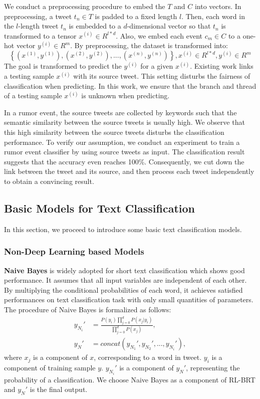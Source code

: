We conduct a preprocessing procedure to embed the $T$ and $C$ into vectors. In preprocessing, a tweet $t_n \in T $ is padded to a fixed length $l$. Then, each word in the $l$-length tweet $t_n$ is embedded to a $d$-dimensional vector so that $t_n$ is transformed to a tensor $x^{(i)} \in R^{l*d}$. Also, we embed each event $c_m \in C$ to a one-hot vector $y^{(i)} \in R^m$. By preprocessing, the dataset is transformed into: $$\left\{ (x^{(1)}, y^{(1)}), (x^{(2)}, y^{(2)}),..., (x^{(n)}, y^{(n)}) \right\}, x^{(i)} \in R^{l*d}, y^{(i)} \in R^m $$ The goal is transformed to predict the $y^{(i)}$ for a given $x^{(i)}$. Existing work \cite{DBLP:conf/www/ChengNB20} links a testing sample $x^{(i)}$ with its source tweet. This setting disturbs the fairness of classification when predicting. In this work, we ensure that the branch and thread of a testing sample $x^{(i)}$ is unknown when predicting.

In a rumor event, the source tweets are collected by keywords such that the semantic similarity between the source tweets is usually high. We observe that this high similarity between the source tweets disturbs the classification performance. To verify our assumption, we conduct an experiment to train a rumor event classifier by using source tweets as input. The classification result suggests that the accuracy even reaches 100\%. Consequently, we cut down the link between the tweet and its source, and then process each tweet independently to obtain a convincing result. 

\subsection{Basic Models for Text Classification}
\label{sec:deeplearning_model} 
In this section, we proceed to introduce some basic text classification models.

\subsubsection{Non-Deep Learning based Models}
\textbf{Naive Bayes} \cite{DBLP:journals/ml/DomingosP97} is widely adopted for short text classification which shows good performance. It assumes that all input variables are independent of each other. By multiplying the conditional probabilities of each word, it achieves satisfied performances on text classification task with only small quantities of parameters. The procedure of Naive Bayes is formalized as follows:
\begin{align}\label{eq:nb}
y_{N_{i}}' &= \frac{P(y_i)\prod_{j = 0}^d P(x_j|y_i)}{\prod_{j = 0}^d P(x_j)},\\
y_N' &= concat(y_{N_{1}}',y_{N_{2}}',..., y_{N_{i}}'),
\end{align}
where $x_j$ is a component of $x$, corresponding to a word in tweet.  $y_i$ is a component of training sample $y$. $y_{N_{i}}'$ is a component of $y_N'$, representing the probability of a classification. We choose Naive Bayes as  a component of RL-BRT and  $y_N'$ is the final output.

